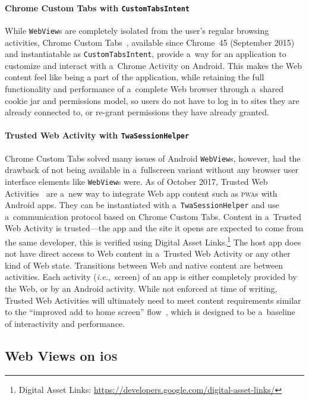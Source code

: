 \documentclass[sigconf]{acmart}
\begin{document}
\paragraph{Chrome Custom Tabs with \texttt{CustomTabsIntent}}

While \texttt{WebView}s are completely isolated from the user's regular browsing activities,
Chrome Custom Tabs~\cite{kinlan2016customtabs}, available since Chrome~45 (September 2015)
and instantiatable as \texttt{CustomTabsIntent}, provide a~way for an application
to customize and interact with a~Chrome Activity on Android.
This makes the Web content feel like being a part of the application,
while retaining the full functionality and performance of a~complete Web browser
through a~shared cookie jar and permissions model, so users do not have to log in
to sites they are already connected to, or re-grant permissions they have already granted.

\paragraph{Trusted Web Activity with \texttt{TwaSessionHelper}}

Chrome Custom Tabs solved many issues of Android \texttt{WebView}s,
however, had the drawback of not being available in a~fullscreen variant
without any browser user interface elements like \texttt{WebView}s were.
As of October 2017, Trusted Web Activities~\cite{googledevelopers2017twa} are a~new way to
integrate Web app content such as \textsc{pwa}s with Android apps.
They can be instantiated with a~\texttt{TwaSessionHelper}
and use a~communication protocol based on Chrome Custom Tabs.
Content in a~Trusted Web Activity is trusted---the app and the site it opens
are expected to come from the same developer, this is verified using Digital Asset
Links.\footnote{Digital Asset Links:
\url{https://developers.google.com/digital-asset-links/}}
The host app does not have direct access to Web content in a~Trusted Web Activity
or any other kind of Web state.
Transitions between Web and native content are between activities.
Each activity (\emph{i.e.},\ screen) of an app is either completely provided by the Web,
or by an Android activity.
While not enforced at time of writing, Trusted Web Activities
will ultimately need to meet content requirements
similar to the ``improved add to home screen'' flow~\cite{kinlan2017a2hs},
which is designed to be a~baseline of interactivity and performance.

\subsection{Web Views on i\textsc{os}}
\end{document}
